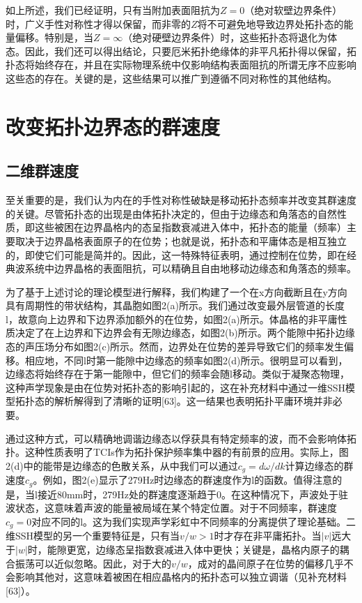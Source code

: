 如上所述，我们已经证明，只有当附加表面阻抗为\(Z = 0\)（绝对软壁边界条件）时，广义手性对称性才得以保留，而非零的\(Z\)将不可避免地导致边界处拓扑态的能量偏移。特别是，当\(Z = \infty\)（绝对硬壁边界条件）时，这些拓扑态将退化为体态。因此，我们还可以得出结论，只要厄米拓扑绝缘体的非平凡拓扑得以保留，拓扑态将始终存在，并且在实际物理系统中仅影响结构表面阻抗的所谓无序不应影响这些态的存在。关键的是，这些结果可以推广到遵循不同对称性的其他结构。



\section{改变拓扑边界态的群速度}
\subsection{二维群速度}
至关重要的是，我们认为内在的手性对称性破缺是移动拓扑态频率并改变其群速度的关键。尽管拓扑态的出现是由体拓扑决定的，但由于边缘态和角落态的自然性质，即这些被困在边界晶格内的态呈指数衰减进入体中，拓扑态的能量（频率）主要取决于边界晶格表面原子的在位势；也就是说，拓扑态和平庸体态是相互独立的，即使它们可能是简并的。因此，这一特殊特征表明，通过控制在位势，即在经典波系统中边界晶格的表面阻抗，可以精确且自由地移动边缘态和角落态的频率。

为了基于上述讨论的理论模型进行解释，我们构建了一个在x方向截断且在y方向具有周期性的带状结构，其晶胞如图2(a)所示。我们通过改变最外层管道的长度l，故意向上边界和下边界添加额外的在位势，如图2(a)所示。体晶格的非平庸性质决定了在上边界和下边界会有无隙边缘态，如图2(b)所示。两个能隙中拓扑边缘态的声压场分布如图2(c)所示。然而，边界处在位势的差异导致它们的频率发生偏移。相应地，不同l时第一能隙中边缘态的频率如图2(d)所示。很明显可以看到，边缘态将始终存在于第一能隙中，但它们的频率会随l移动。类似于凝聚态物理，这种声学现象是由在位势对拓扑态的影响引起的，这在补充材料中通过一维SSH模型拓扑态的解析解得到了清晰的证明[63]。这一结果也表明拓扑平庸环境并非必要。

通过这种方式，可以精确地调谐边缘态以俘获具有特定频率的波，而不会影响体拓扑。这种性质表明了TCIs作为拓扑保护频率集中器的有前景的应用。实际上，图2(d)中的能带是边缘态的色散关系，从中我们可以通过$c_g = d\omega/dk$计算边缘态的群速度$c_g$。例如，图2(e)显示了279Hz时边缘态的群速度作为l的函数。值得注意的是，当l接近80mm时，279Hz处的群速度逐渐趋于0。在这种情况下，声波处于驻波状态，这意味着声波的能量被局域在某个特定位置。对于不同频率，群速度$c_g = 0$对应不同的l。这为我们实现声学彩虹中不同频率的分离提供了理论基础。二维SSH模型的另一个重要特征是，只有当$v/w > 1$时才存在非平庸拓扑。当$|v|$远大于$|w|$时，能隙更宽，边缘态呈指数衰减进入体中更快；关键是，晶格内原子的耦合振荡可以近似忽略。因此，对于大的$v/w$，成对的晶间原子在位势的偏移几乎不会影响其他对，这意味着被困在相应晶格内的拓扑态可以独立调谐（见补充材料[63]）。

